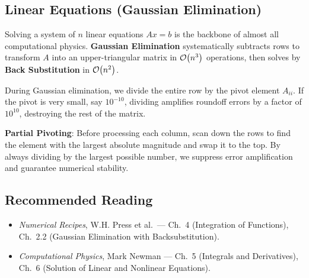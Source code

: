 \subsection{Linear Equations (Gaussian Elimination)}
Solving a system of $n$ linear equations $Ax = b$ is the backbone of almost
all computational physics. \textbf{Gaussian Elimination} systematically
subtracts rows to transform $A$ into an upper-triangular matrix in
$\mathcal{O}\!\left(n^3\right)$ operations, then solves by \textbf{Back Substitution} in
$\mathcal{O}\!\left(n^2\right)$.

\begin{tcolorbox}[colback=green!5!white,colframe=green!50!black,
  title=The Critical Necessity of Partial Pivoting]
During Gaussian elimination, we divide the entire row by the pivot element
$A_{ii}$. If the pivot is very small, say $10^{-10}$, dividing amplifies
roundoff errors by a factor of $10^{10}$, destroying the rest of the matrix.

\textbf{Partial Pivoting}: Before processing each column, scan down the rows
to find the element with the largest absolute magnitude and swap it to the
top. By always dividing by the largest possible number, we suppress error
amplification and guarantee numerical stability.
\end{tcolorbox}

\subsection*{Recommended Reading}
\begin{itemize}
    \item \textit{Numerical Recipes}, W.H. Press et al.\ --- Ch.\ 4
    (Integration of Functions), Ch.\ 2.2 (Gaussian Elimination with
    Backsubstitution).
    \item \textit{Computational Physics}, Mark Newman --- Ch.\ 5 (Integrals
    and Derivatives), Ch.\ 6 (Solution of Linear and Nonlinear Equations).
\end{itemize}
